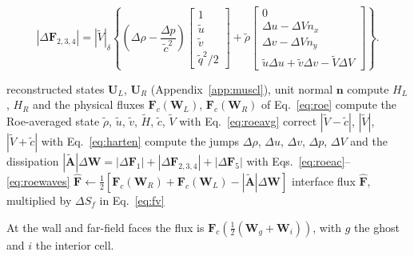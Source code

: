 \documentclass[12pt,a4paper]{article}
\begin{document}
\begin{itemize}
\begin{equation}
    \label{eq:roeac}
  \end{equation}
  \begin{equation}
    |\Delta\mathbf{F}_{2,3,4}|=|\tilde V|_\delta\left\{\left(\Delta\rho-\frac{\Delta p}{\tilde c^2}\right)
    \begin{bmatrix}1\\ \tilde u\\ \tilde v\\ \tilde q^2/2\end{bmatrix}
    +\tilde\rho\begin{bmatrix}0\\ \Delta u-\Delta V n_x\\ \Delta v-\Delta V n_y\\ \tilde u\Delta u+\tilde v\Delta v-\tilde V\Delta V\end{bmatrix}\right\}.
    \label{eq:roewaves}
  \end{equation}
\end{itemize}

\begin{algorithm}[H]
  \caption{Roe flux at one face}
  \label{alg:roe}
  \begin{algorithmic}[1]
    \REQUIRE reconstructed states $\mathbf{U}_L$, $\mathbf{U}_R$ (Appendix~\ref{app:muscl}), unit normal $\mathbf{n}$
    \STATE compute $H_L$, $H_R$ and the physical fluxes $\mathbf{F}_c(\mathbf{W}_L)$, $\mathbf{F}_c(\mathbf{W}_R)$ of Eq.~\eqref{eq:roe}
    \STATE compute the Roe-averaged state $\tilde\rho$, $\tilde u$, $\tilde v$, $\tilde H$, $\tilde c$, $\tilde V$ with Eq.~\eqref{eq:roeavg}
    \STATE correct $|\tilde V-\tilde c|$, $|\tilde V|$, $|\tilde V+\tilde c|$ with Eq.~\eqref{eq:harten}
    \STATE compute the jumps $\Delta\rho$, $\Delta u$, $\Delta v$, $\Delta p$, $\Delta V$ and the dissipation
           $|\tilde{\mathbf{A}}|\Delta\mathbf{W}=|\Delta\mathbf{F}_1|+|\Delta\mathbf{F}_{2,3,4}|+|\Delta\mathbf{F}_5|$
           with Eqs.~\eqref{eq:roeac}--\eqref{eq:roewaves}
    \STATE $\widehat{\mathbf{F}}\gets\tfrac12\left[\mathbf{F}_c(\mathbf{W}_R)+\mathbf{F}_c(\mathbf{W}_L)-|\tilde{\mathbf{A}}|\Delta\mathbf{W}\right]$
    \ENSURE interface flux $\widehat{\mathbf{F}}$, multiplied by $\Delta S_f$ in Eq.~\eqref{eq:fv}
  \end{algorithmic}
\end{algorithm}

At the wall and far-field faces the flux is $\mathbf{F}_c\!\left(\tfrac12(\mathbf{W}_g+\mathbf{W}_i)\right)$,
with $g$ the ghost and $i$ the interior cell.
\end{document}
